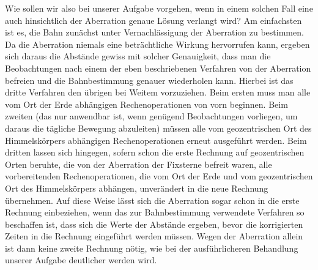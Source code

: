 Wie sollen wir also bei unserer Aufgabe vorgehen, wenn in einem solchen Fall eine auch hinsichtlich der Aberration genaue Lösung verlangt wird? Am einfachsten ist es, die Bahn zunächst unter Vernachlässigung der Aberration zu bestimmen. Da die Aberration niemals eine beträchtliche Wirkung hervorrufen kann, ergeben sich daraus die Abstände gewiss mit solcher Genauigkeit, dass man die Beobachtungen nach einem der eben beschriebenen Verfahren von der Aberration befreien und die Bahnbestimmung genauer wiederholen kann. Hierbei ist das dritte Verfahren den übrigen bei Weitem vorzuziehen. Beim ersten muss man alle vom Ort der Erde abhängigen Rechenoperationen von vorn beginnen. Beim zweiten (das nur anwendbar ist, wenn genügend Beobachtungen vorliegen, um daraus die tägliche Bewegung abzuleiten) müssen alle vom geozentrischen Ort des Himmelskörpers abhängigen Rechenoperationen erneut ausgeführt werden. Beim dritten lassen sich hingegen, sofern schon die erste Rechnung auf geozentrischen Orten beruhte, die von der Aberration der Fixsterne befreit waren, alle vorbereitenden Rechenoperationen, die vom Ort der Erde und vom geozentrischen Ort des Himmelskörpers abhängen, unverändert in die neue Rechnung übernehmen. Auf diese Weise lässt sich die Aberration sogar schon in die erste Rechnung einbeziehen, wenn das zur Bahnbestimmung verwendete Verfahren so beschaffen ist, dass sich die Werte der Abstände ergeben, bevor die korrigierten Zeiten in die Rechnung eingeführt werden müssen. Wegen der Aberration allein ist dann keine zweite Rechnung nötig, wie bei der ausführlicheren Behandlung unserer Aufgabe deutlicher werden wird.
